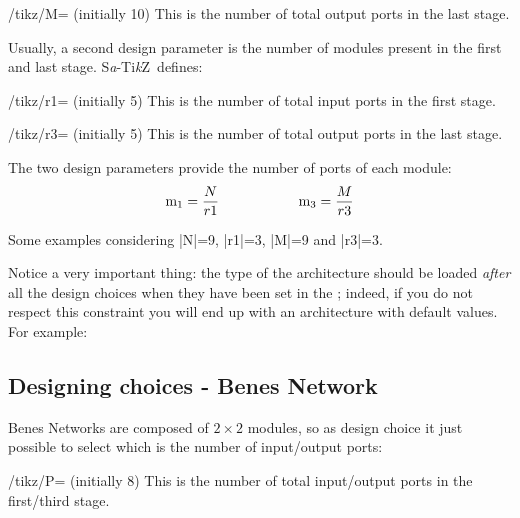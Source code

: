 \documentclass{ltxdoc} %
\newcommand\Tikz{Ti\textit kZ}
\newcommand{\saTikZ}{\textsc S\textit a-\Tikz}
\begin{document}
\begin{key}{/tikz/M= (initially 10)}
    This is the number of total output ports in the last stage.
\end{key}
Usually, a second design parameter is the number of modules present in the first and last stage. \saTikZ\ defines:
\begin{key}{/tikz/r1= (initially 5)}
    This is the number of total input ports in the first stage.
\end{key}

\begin{key}{/tikz/r3= (initially 5)}
    This is the number of total output ports in the last stage.
\end{key}
The two design parameters provide the number of ports of each module:
\[\textrm{m}_1=\dfrac{N}{r1} \hspace*{2cm} \textrm{m}_3=\dfrac{M}{r3} \]

Some examples considering |N|=9, |r1|=3, |M|=9 and |r3|=3.
\begin{codeexample}[]
\begin{tikzpicture}
    \node[N=9,r1=3,M=9,r3=3,clos rear] {};
\end{tikzpicture}
\end{codeexample}

\begin{codeexample}[]
\begin{tikzpicture}
    \node[N=9,r1=3,M=9,r3=3,clos snb] {};
\end{tikzpicture}
\end{codeexample}

Notice a very important thing: the type of the architecture should be loaded \emph{after} all the design choices when they have been set in the ; indeed, if you do not respect this constraint you will end up with an architecture with default values. For example:

\begin{codeexample}[]
\begin{tikzpicture}
    \node[clos rear,N=9,r1=3,M=9,r3=3] {};
\end{tikzpicture}
\end{codeexample}

\subsection{Designing choices - Benes Network}
Benes Networks are composed of $2 \times 2$ modules, so as design choice it just possible to select which is the number of input/output ports:
\begin{key}{/tikz/P= (initially 8)}
    This is the number of total input/output ports in the first/third stage.
\end{key}
\end{document}
